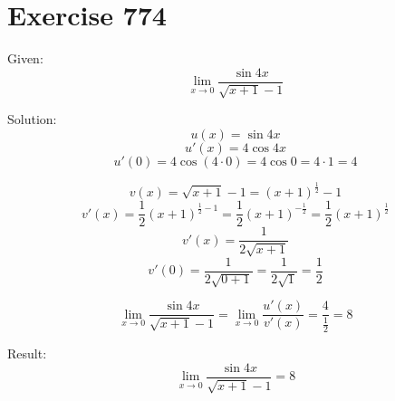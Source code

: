 \documentclass[a4paper, 10pt]{scrartcl}
\begin{document}
\section{Exercise 774}

Given:
\[
\lim_{x\to 0}{\frac{\sin{4x}}{\sqrt{x + 1} - 1}}
\]

Solution:
\[
u(x) = \sin{4x}
\]
\[
u'(x) = 4\cos{4x}
\]
\[
u'(0) = 4\cos{(4\cdot 0)} = 4\cos{0} = 4\cdot 1 = 4
\]

\[
v(x) = \sqrt{x + 1} - 1 = (x + 1)^{\frac{1}{2}} - 1
\]
\[
v'(x) = \frac{1}{2}(x + 1)^{\frac{1}{2} - 1} = \frac{1}{2}(x + 1)^{-\frac{1}{2}} = \frac{1}{2}(x + 1)^{\frac{1}{2}}
\]
\[
v'(x) = \frac{1}{2\sqrt{x + 1}}
\]
\[
v'(0) = \frac{1}{2\sqrt{0 + 1}} = \frac{1}{2\sqrt{1}} = \frac{1}{2}
\]

\[
\lim_{x\to 0}{\frac{\sin{4x}}{\sqrt{x + 1} - 1}} = \lim_{x\to 0}{\frac{u'(x)}{v'(x)}} = \frac{4}{\frac{1}{2}} = 8
\]

Result:
\[
\lim_{x\to 0}{\frac{\sin{4x}}{\sqrt{x + 1} - 1}} = 8
\]
\end{document}
